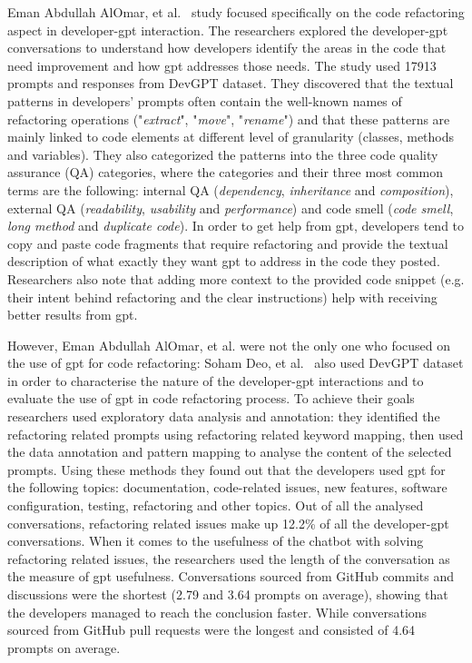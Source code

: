 Eman Abdullah AlOmar, et al.~\cite{devgpt-refactoring-study} study focused specifically on the code refactoring aspect in developer-\gls{gpt} interaction. The researchers explored the developer-\gls{gpt} conversations to understand how developers identify the areas in the code that need improvement and how \gls{gpt} addresses those needs. The study used 17913 prompts and responses from DevGPT dataset. They discovered that the textual patterns in developers' prompts often contain the well-known names of refactoring operations ("\textit{extract}", "\textit{move}", "\textit{rename}") and that these patterns are mainly linked to code elements at different level of granularity (classes, methods and variables). They also categorized the patterns into the three code quality assurance (QA) categories, where the categories and their three most common terms are the following: internal QA (\textit{dependency}, \textit{inheritance} and \textit{composition}), external QA (\textit{readability}, \textit{usability} and \textit{performance}) and code smell (\textit{code smell}, \textit{long method} and \textit{duplicate code}). In order to get help from \gls{gpt}, developers tend to copy and paste code fragments that require refactoring and provide the textual description of what exactly they want \gls{gpt} to address in the code they posted. Researchers also note that adding more context to the provided code snippet (e.g. their intent behind refactoring and the clear instructions) help with receiving better results from \gls{gpt}. 

However, Eman Abdullah AlOmar, et al. were not the only one who focused on the use of \gls{gpt} for code refactoring: Soham Deo, et al.~\cite{devgpt_refactoring_2} also used DevGPT dataset in order to characterise the nature of the developer-\gls{gpt} interactions and to evaluate the use of \gls{gpt} in code refactoring process. To achieve their goals researchers used exploratory data analysis and annotation: they identified the refactoring related prompts using refactoring related keyword mapping, then used the data annotation and pattern mapping to analyse the content of the selected prompts. Using these methods they found out that the developers used \gls{gpt} for the following topics: documentation, code-related issues, new features, software configuration, testing, refactoring and other topics. Out of all the analysed conversations, refactoring related issues make up 12.2\% of all the developer-\gls{gpt} conversations. When it comes to the usefulness of the chatbot with solving refactoring related issues, the researchers used the length of the conversation as the measure of \gls{gpt} usefulness. Conversations sourced from GitHub commits and discussions were the shortest (2.79 and 3.64 prompts on average), showing that the developers managed to reach the conclusion faster. While conversations sourced from GitHub pull requests were the longest and consisted of 4.64 prompts on average. 

